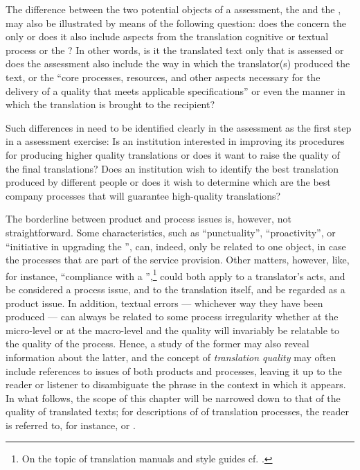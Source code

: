 \documentclass[output=paper]{langsci/langscibook}
\begin{document}
The difference between the two potential objects of a  assessment, the  and the , may also be illustrated by means of the following question: does the  concern the  only or does it also include aspects from the translation cognitive or textual process or the ? In other words, is it the translated text only that is assessed or does the assessment also include the way in which the translator(s) produced the text, or the ``core processes, resources, and other aspects necessary for the delivery of a quality  that meets applicable specifications'' \citep{ISO2015} or even the manner in which the translation is brought to the recipient? 

Such differences in  need to be identified clearly in the assessment as the first step in a  assessment exercise: Is an institution interested in improving its procedures for producing higher quality translations or does it want to raise the quality of the final translations? Does an institution wish to identify the best translation produced by different people or does it wish to determine which are the best company processes that will guarantee high-quality translations?

The borderline between product and process issues is, however, not straightforward. Some characteristics, such as ``punctuality'', ``proactivity'', or ``initiative in upgrading the '', can, indeed, only be related to one object, in case the processes that are part of the service provision. Other matters, however, like, for instance, ``compliance with a '',\footnote{On the topic of translation manuals and style guides cf. .} could both apply to a translator's acts, and be considered a process issue, and to the translation itself, and be regarded as a product issue. In addition, textual errors — whichever way they have been produced — can always be related to some process irregularity whether at the micro-level or at the macro-level and the  quality will invariably be relatable to the quality of the process. Hence, a study of the former may also reveal information about the latter, and the concept of \textit{translation quality} may often include references to issues of both products and processes, leaving it up to the reader or listener to disambiguate the phrase in the context in which it appears. In what follows, the scope of this chapter will be narrowed down to that of the quality of translated texts; for descriptions of  of translation processes, the reader is referred to, for instance, \citet{Mertin2006} or \citet{Drugan2013}. 
\end{document}
